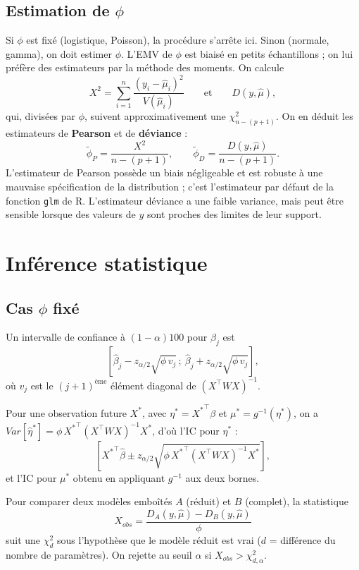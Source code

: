 \documentclass[
  french,
  letterpaper,
  DIV=11,
  numbers=noendperiod]{scrreprt}
\begin{document}
\subsection{\texorpdfstring{Estimation de
\(\phi\)}{Estimation de \textbackslash phi}}\label{estimation-de-phi}

Si \(\phi\) est fixé (logistique, Poisson), la procédure s'arrête ici.
Sinon (normale, gamma), on doit estimer \(\phi\). L'EMV de \(\phi\) est
biaisé en petits échantillons ; on lui préfère des estimateurs par la
méthode des moments. On calcule
\[X^2 = \sum_{i=1}^n\frac{(y_i - \hat\mu_i)^2}{V(\hat\mu_i)} \qquad\mbox{et}\qquad D(y,\hat\mu),\]
qui, divisées par \(\phi\), suivent approximativement une
\(\chi^2_{n-(p+1)}\). On en déduit les estimateurs de \textbf{Pearson}
et de \textbf{déviance} :
\[\tilde\phi_P = \frac{X^2}{n-(p+1)}, \qquad \tilde\phi_D = \frac{D(y,\hat\mu)}{n-(p+1)}.\]
L'estimateur de Pearson possède un biais négligeable et est robuste à
une mauvaise spécification de la distribution ; c'est l'estimateur par
défaut de la fonction \texttt{glm} de R. L'estimateur déviance a une
faible variance, mais peut être sensible lorsque des valeurs de \(y\)
sont proches des limites de leur support.

\section{Inférence statistique}\label{infuxe9rence-statistique-2}

\subsection{\texorpdfstring{Cas \(\phi\)
fixé}{Cas \textbackslash phi fixé}}\label{cas-phi-fixuxe9}

Un intervalle de confiance à \((1-\alpha)100%
\) pour \(\beta_j\) est
\[\left[\hat\beta_j - z_{\alpha/2}\sqrt{\phi\, v_j}\,;\ \hat\beta_j + z_{\alpha/2}\sqrt{\phi\, v_j}\right],\]
où \(v_j\) est le \((j+1)^{\text{ème}}\) élément diagonal de
\((X^\top W X)^{-1}\).

Pour une observation future \(X^*\), avec \(\eta^* = {X^*}^\top\beta\)
et \(\mu^* = g^{-1}(\eta^*)\), on a
\(Var[\hat\eta^*] = \phi\,{X^*}^\top(X^\top W X)^{-1}X^*\), d'où l'IC
pour \(\eta^*\) :
\[\left[{X^*}^\top\hat\beta \pm z_{\alpha/2}\sqrt{\phi\,{X^*}^\top(X^\top WX)^{-1}X^*}\right],\]
et l'IC pour \(\mu^*\) obtenu en appliquant \(g^{-1}\) aux deux bornes.

Pour comparer deux modèles emboîtés \(A\) (réduit) et \(B\) (complet),
la statistique
\[X_{obs} = \frac{D_A(y,\hat\mu) - D_B(y,\hat\mu)}{\phi}\] suit une
\(\chi^2_d\) sous l'hypothèse que le modèle réduit est vrai (\(d\) =
différence du nombre de paramètres). On rejette au seuil \(\alpha\) si
\(X_{obs} > \chi^2_{d,\alpha}\).
\end{document}
